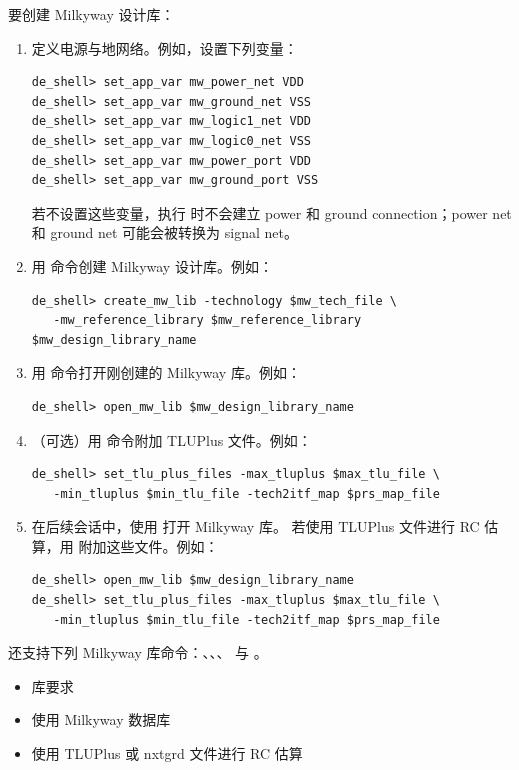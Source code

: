 要创建 Milkyway 设计库：
\begin{enumerate}
  \item 定义电源与地网络。例如，设置下列变量：
\begin{lstlisting}
de_shell> set_app_var mw_power_net VDD
de_shell> set_app_var mw_ground_net VSS
de_shell> set_app_var mw_logic1_net VDD
de_shell> set_app_var mw_logic0_net VSS
de_shell> set_app_var mw_power_port VDD
de_shell> set_app_var mw_ground_port VSS
\end{lstlisting}
        若不设置这些变量，执行  时不会建立 power 和 ground connection；power net 和 ground net 可能会被转换为 signal net。

  \item 用  命令创建 Milkyway 设计库。例如：
\begin{lstlisting}
de_shell> create_mw_lib -technology $mw_tech_file \
   -mw_reference_library $mw_reference_library $mw_design_library_name
\end{lstlisting}

  \item 用  命令打开刚创建的 Milkyway 库。例如：
\begin{lstlisting}
de_shell> open_mw_lib $mw_design_library_name
\end{lstlisting}

  \item （可选）用  命令附加 TLUPlus 文件。例如：
\begin{lstlisting}
de_shell> set_tlu_plus_files -max_tluplus $max_tlu_file \
   -min_tluplus $min_tlu_file -tech2itf_map $prs_map_file
\end{lstlisting}

  \item 在后续会话中，使用  打开 Milkyway 库。
        若使用 TLUPlus 文件进行 RC 估算，用  附加这些文件。例如：
\begin{lstlisting}
de_shell> open_mw_lib $mw_design_library_name
de_shell> set_tlu_plus_files -max_tluplus $max_tlu_file \
   -min_tluplus $min_tlu_file -tech2itf_map $prs_map_file
\end{lstlisting}
\end{enumerate}

还支持下列 Milkyway 库命令：、、、 与 。

\begin{seeAlsoBox}
\begin{itemize}
  \item 库要求
  \item 使用 Milkyway 数据库
  \item 使用 TLUPlus 或 nxtgrd 文件进行 RC 估算
\end{itemize}
\end{seeAlsoBox}

